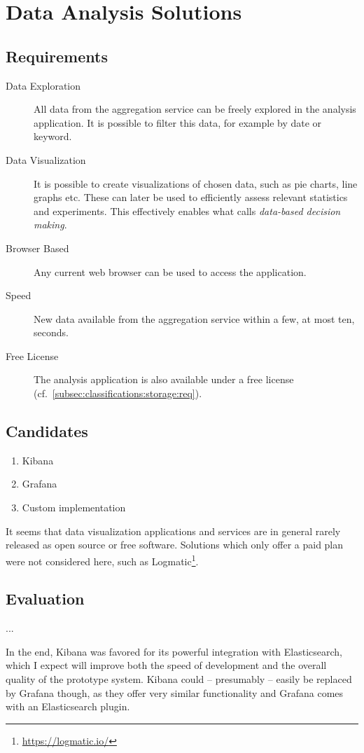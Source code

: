 \section{Data Analysis Solutions}
\label{sec:classifications:analysis}

\subsection{Requirements}

\begin{description}
\item[Data Exploration] All data from the aggregation service can be freely explored in the analysis application.
It is possible to filter this data, for example by date or keyword.
\item[Data Visualization] It is possible to create visualizations of chosen data, such as pie charts, line graphs etc.
These can later be used to efficiently assess relevant statistics and experiments.
This effectively enables what \citet{Bosch2012} calls \emph{data-based decision making}.
\item[Browser Based] Any current web browser can be used to access the application.
\item[Speed] New data available from the aggregation service within a few, at most ten, seconds.
\item[Free License] The analysis application is also available under a free license (cf.~\cref{subsec:classifications:storage:req}).
\end{description}

\subsection{Candidates}

\begin{enumerate}
\item Kibana
\item Grafana
\item Custom implementation
\end{enumerate}

It seems that data visualization applications and services are in general rarely released as open source or free software.
Solutions which only offer a paid plan were not considered here, such as Logmatic\footnote{\url{https://logmatic.io/}}.

\subsection{Evaluation}

...

In the end, Kibana was favored for its powerful integration with Elasticsearch, which I expect will improve both the speed of development and the overall quality of the prototype system.
Kibana could -- presumably -- easily be replaced by Grafana though, as they offer very similar functionality and Grafana comes with an Elasticsearch plugin.
